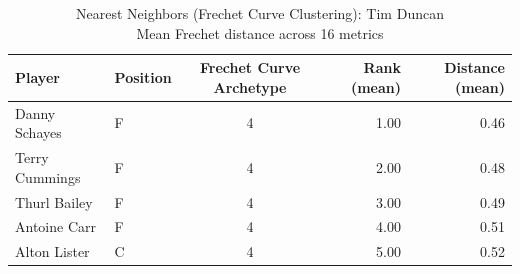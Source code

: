 \begin{table}[t]
\caption*{
{\fontsize{20}{25} Nearest Neighbors (Frechet Curve Clustering): Tim Duncan\fontsize{12}{15}\selectfont } \\ 
{\fontsize{14}{17}\selectfont  Mean Frechet distance across 16 metrics\fontsize{12}{15}\selectfont }
} 
\fontsize{12.0pt}{14.0pt}\selectfont
\begin{tabular*}{\linewidth}{@{\extracolsep{\fill}}llcrr}
\toprule
Player & Position & Frechet Curve Archetype & Rank (mean) & Distance (mean) \\ 
\midrule\addlinespace[2.5pt]
Danny Schayes & F & 4 & 1.00 & 0.46 \\ 
Terry Cummings & F & 4 & 2.00 & 0.48 \\ 
Thurl Bailey & F & 4 & 3.00 & 0.49 \\ 
Antoine Carr & F & 4 & 4.00 & 0.51 \\ 
Alton Lister & C & 4 & 5.00 & 0.52 \\ 
\bottomrule
\end{tabular*}
\end{table}

